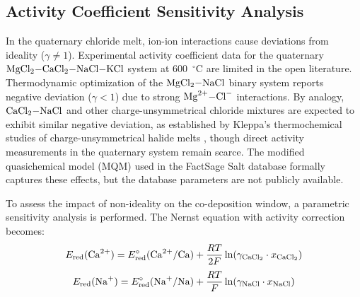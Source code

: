 \documentclass[sn-mathphys,Numbered]{sn-jnl}
\begin{document}
\subsection{Activity Coefficient Sensitivity Analysis}
\label{subsec:activity}

In the quaternary chloride melt, ion-ion interactions cause deviations from ideality ($\gamma \neq 1$). Experimental activity coefficient data for the quaternary $\ce{MgCl2-CaCl2-NaCl-KCl}$ system at 600~$^{\circ}$C are limited in the open literature. Thermodynamic optimization of the $\ce{MgCl2-NaCl}$ binary system \cite{chartrand2000} reports negative deviation ($\gamma < 1$) due to strong $\ce{Mg^{2+}-Cl^{-}}$ interactions. By analogy, $\ce{CaCl2-NaCl}$ and other charge-unsymmetrical chloride mixtures are expected to exhibit similar negative deviation, as established by Kleppa's thermochemical studies of charge-unsymmetrical halide melts \cite{kleppa1966}, though direct activity measurements in the quaternary system remain scarce. The modified quasichemical model (MQM) used in the FactSage Salt database \cite{pelton2000mqm} formally captures these effects, but the database parameters are not publicly available.

To assess the impact of non-ideality on the co-deposition window, a parametric sensitivity analysis is performed. The Nernst equation with activity correction becomes:
\begin{equation}
\label{eq:canernst}
E_{\mathrm{red}}(\ce{Ca^{2+}}) = E^{\circ}_{\mathrm{red}}(\ce{Ca^{2+}/Ca}) + \frac{RT}{2F}\ln(\gamma_{\ce{CaCl2}} \cdot x_{\ce{CaCl2}})
\end{equation}
\begin{equation}
\label{eq:naernst}
E_{\mathrm{red}}(\ce{Na+}) = E^{\circ}_{\mathrm{red}}(\ce{Na+/Na}) + \frac{RT}{F}\ln(\gamma_{\ce{NaCl}} \cdot x_{\ce{NaCl}})
\end{equation}
\end{document}
